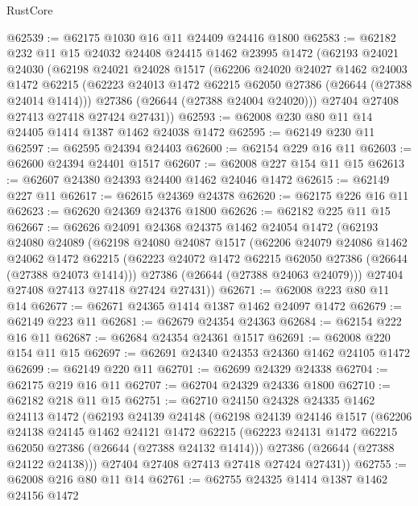 \begin{lexlean}{RustCore}
\begin{coremodule}
@62539 := @62175 @1030 @16 @11 @24409 @24416 @1800
@62583 := @62182
    @232
    @11
    @15
    @24032
    @24408
    @24415
    @1462
    @23995
    @1472
    (@62193
      @24021
      @24030
      (@62198
        @24021
        @24028
        @1517
        (@62206
          @24020
          @24027
          @1462
          @24003
          @1472
          @62215
          (@62223 @24013 @1472 @62215 @62050 @27386 (@26644 (@27388 @24014 @1414)))
          @27386
          (@26644 (@27388 @24004 @24020)))
        @27404
        @27408
        @27413
        @27418
        @27424
        @27431))
@62593 := @62008 @230 @80 @11 @14 @24405 @1414 @1387 @1462 @24038 @1472
@62595 := @62149 @230 @11
@62597 := @62595 @24394 @24403
@62600 := @62154 @229 @16 @11
@62603 := @62600 @24394 @24401 @1517
@62607 := @62008 @227 @154 @11 @15
@62613 := @62607 @24380 @24393 @24400 @1462 @24046 @1472
@62615 := @62149 @227 @11
@62617 := @62615 @24369 @24378
@62620 := @62175 @226 @16 @11
@62623 := @62620 @24369 @24376 @1800
@62626 := @62182 @225 @11 @15
@62667 := @62626
    @24091
    @24368
    @24375
    @1462
    @24054
    @1472
    (@62193
      @24080
      @24089
      (@62198
        @24080
        @24087
        @1517
        (@62206
          @24079
          @24086
          @1462
          @24062
          @1472
          @62215
          (@62223 @24072 @1472 @62215 @62050 @27386 (@26644 (@27388 @24073 @1414)))
          @27386
          (@26644 (@27388 @24063 @24079)))
        @27404
        @27408
        @27413
        @27418
        @27424
        @27431))
@62671 := @62008 @223 @80 @11 @14
@62677 := @62671 @24365 @1414 @1387 @1462 @24097 @1472
@62679 := @62149 @223 @11
@62681 := @62679 @24354 @24363
@62684 := @62154 @222 @16 @11
@62687 := @62684 @24354 @24361 @1517
@62691 := @62008 @220 @154 @11 @15
@62697 := @62691 @24340 @24353 @24360 @1462 @24105 @1472
@62699 := @62149 @220 @11
@62701 := @62699 @24329 @24338
@62704 := @62175 @219 @16 @11
@62707 := @62704 @24329 @24336 @1800
@62710 := @62182 @218 @11 @15
@62751 := @62710
    @24150
    @24328
    @24335
    @1462
    @24113
    @1472
    (@62193
      @24139
      @24148
      (@62198
        @24139
        @24146
        @1517
        (@62206
          @24138
          @24145
          @1462
          @24121
          @1472
          @62215
          (@62223 @24131 @1472 @62215 @62050 @27386 (@26644 (@27388 @24132 @1414)))
          @27386
          (@26644 (@27388 @24122 @24138)))
        @27404
        @27408
        @27413
        @27418
        @27424
        @27431))
@62755 := @62008 @216 @80 @11 @14
@62761 := @62755 @24325 @1414 @1387 @1462 @24156 @1472

\end{coremodule}
\end{lexlean}
